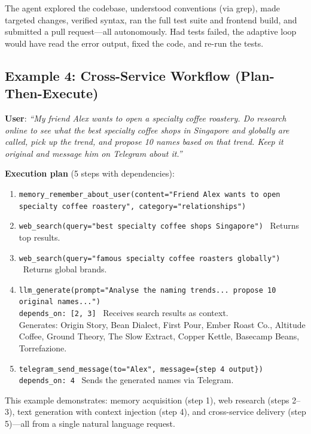 The agent explored the codebase, understood conventions (via grep), made targeted changes, verified syntax, ran the full test suite and frontend build, and submitted a pull request---all autonomously. Had tests failed, the adaptive loop would have read the error output, fixed the code, and re-run the tests.

\subsection{Example 4: Cross-Service Workflow (Plan-Then-Execute)}

\textbf{User}: \textit{``My friend Alex wants to open a specialty coffee roastery. Do research online to see what the best specialty coffee shops in Singapore and globally are called, pick up the trend, and propose 10 names based on that trend. Keep it original and message him on Telegram about it.''}

\textbf{Execution plan} (5 steps with dependencies):

\begin{enumerate}[leftmargin=*]
  \item \texttt{memory\_remember\_about\_user(content="Friend Alex wants to open specialty coffee roastery", category="relationships")}

  \item \texttt{web\_search(query="best specialty coffee shops Singapore")} \textrightarrow\ Returns top results.

  \item \texttt{web\_search(query="famous specialty coffee roasters globally")} \textrightarrow\ Returns global brands.

  \item \texttt{llm\_generate(prompt="Analyse the naming trends... propose 10 original names...")}\\
    \texttt{depends\_on: [2, 3]} \textrightarrow\ Receives search results as context.\\
    Generates: Origin Story, Bean Dialect, First Pour, Ember Roast Co., Altitude Coffee, Ground Theory, The Slow Extract, Copper Kettle, Basecamp Beans, Torrefazione.

  \item \texttt{telegram\_send\_message(to="Alex", message=\{step 4 output\})}\\
    \texttt{depends\_on: 4} \textrightarrow\ Sends the generated names via Telegram.
\end{enumerate}

This example demonstrates: memory acquisition (step 1), web research (steps 2--3), text generation with context injection (step 4), and cross-service delivery (step 5)---all from a single natural language request.
